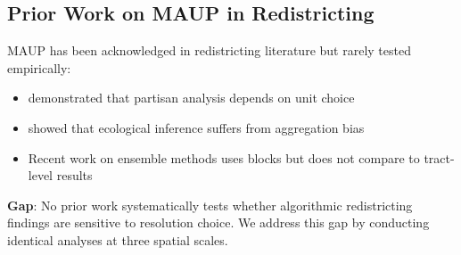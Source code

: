 \subsection{Prior Work on MAUP in Redistricting}

MAUP has been acknowledged in redistricting literature but rarely tested empirically:

\begin{itemize}
    \item \citet{altman1998scaling} demonstrated that partisan analysis depends on unit choice
    \item \citet{voss1995ecological} showed that ecological inference suffers from aggregation bias
    \item Recent work on ensemble methods \citep{duchin2018gerrymandering} uses blocks but does not compare to tract-level results
\end{itemize}

\textbf{Gap}: No prior work systematically tests whether algorithmic redistricting findings are sensitive to resolution choice. We address this gap by conducting identical analyses at three spatial scales.
